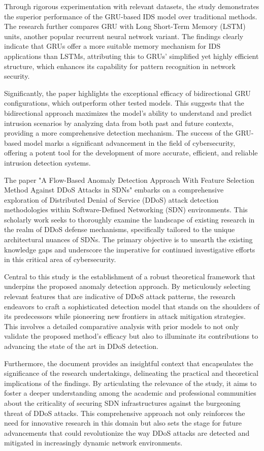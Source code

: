 Through rigorous experimentation with relevant datasets, the study demonstrates the superior performance of the GRU-based IDS model over traditional methods. The research further compares GRU with Long Short-Term Memory (LSTM) units, another popular recurrent neural network variant. The findings clearly indicate that GRUs offer a more suitable memory mechanism for IDS applications than LSTMs, attributing this to GRUs' simplified yet highly efficient structure, which enhances its capability for pattern recognition in network security.\par 
Significantly, the paper highlights the exceptional efficacy of bidirectional GRU configurations, which outperform other tested models. This suggests that the bidirectional approach maximizes the model's ability to understand and predict intrusion scenarios by analyzing data from both past and future contexts, providing a more comprehensive detection mechanism. The success of the GRU-based model marks a significant advancement in the field of cybersecurity, offering a potent tool for the development of more accurate, efficient, and reliable intrusion detection systems\cite{xu2018intrusion}.
\par 
The paper "A Flow-Based Anomaly Detection Approach With Feature Selection Method Against DDoS Attacks in SDNs" embarks on a comprehensive exploration of Distributed Denial of Service (DDoS) attack detection methodologies within Software-Defined Networking (SDN) environments. This scholarly work seeks to thoroughly examine the landscape of existing research in the realm of DDoS defense mechanisms, specifically tailored to the unique architectural nuances of SDNs. The primary objective is to unearth the existing knowledge gaps and underscore the imperative for continued investigative efforts in this critical area of cybersecurity.\par 
Central to this study is the establishment of a robust theoretical framework that underpins the proposed anomaly detection approach. By meticulously selecting relevant features that are indicative of DDoS attack patterns, the research endeavors to craft a sophisticated detection model that stands on the shoulders of its predecessors while pioneering new frontiers in attack mitigation strategies. This involves a detailed comparative analysis with prior models to not only validate the proposed method's efficacy but also to illuminate its contributions to advancing the state of the art in DDoS detection.\par 
Furthermore, the document provides an insightful context that encapsulates the significance of the research undertakings, delineating the practical and theoretical implications of the findings. By articulating the relevance of the study, it aims to foster a deeper understanding among the academic and professional communities about the criticality of securing SDN infrastructures against the burgeoning threat of DDoS attacks. This comprehensive approach not only reinforces the need for innovative research in this domain but also sets the stage for future advancements that could revolutionize the way DDoS attacks are detected and mitigated in increasingly dynamic network environments\cite{9810168}.
